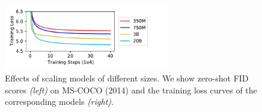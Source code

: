 \begin{figure}[tbh!]
\centering
{}
\qquad
\includegraphics[width=0.64\textwidth]{figures/losscurve.pdf}
\caption{Effects of scaling \bdraw models of different sizes.
We show zero-shot FID scores \textit{(left)} on MS-COCO (2014) and the training loss curves of the corresponding models \textit{(right)}.}
\label{tabs:scaling_results}
\end{figure}